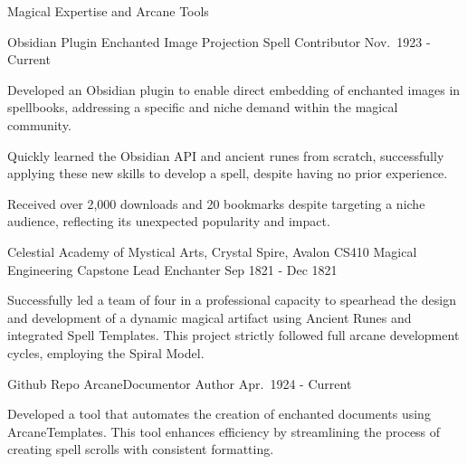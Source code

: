 \documentclass[11pt, a4paper]{awesome-cv}
\begin{document}
\begin{cvsubsection}{Magical Expertise and Arcane Tools}
\begin{cventries}
\cventry
{Obsidian Plugin}
{Enchanted Image Projection}
{Spell Contributor}
{Nov.~1923 - Current}
{
\begin{cvitems}
    \item{\normalsize Developed an Obsidian plugin to enable direct
embedding of enchanted images in spellbooks, addressing a specific and
niche demand within the magical community.}
    \item{\normalsize Quickly learned the Obsidian API and ancient runes
from scratch, successfully applying these new skills to develop a spell,
despite having no prior experience.}
    \item{\normalsize Received over 2,000 downloads and 20 bookmarks
despite targeting a niche audience, reflecting its unexpected popularity
and impact.}
\end{cvitems}
}
\cventry
{Celestial Academy of Mystical Arts, Crystal Spire, Avalon}
{CS410 Magical Engineering Capstone}
{Lead Enchanter}
{Sep 1821 - Dec 1821}
{
\begin{cvitems}
    \item{\normalsize Successfully led a team of four in a professional
capacity to spearhead the design and development of a dynamic magical
artifact using Ancient Runes and integrated Spell Templates. This
project strictly followed full arcane development cycles, employing the
Spiral Model.}
\end{cvitems}
}
\cventry
{Github Repo}
{ArcaneDocumentor}
{Author}
{Apr.~1924 - Current}
{
\begin{cvitems}
    \item{\normalsize Developed a tool that automates the creation of
enchanted documents using ArcaneTemplates. This tool enhances efficiency
by streamlining the process of creating spell scrolls with consistent
formatting.}
\end{cvitems}
}
\end{cventries}


\begin{cventries}


\end{cventries}
\end{cvsubsection}
\end{document}
